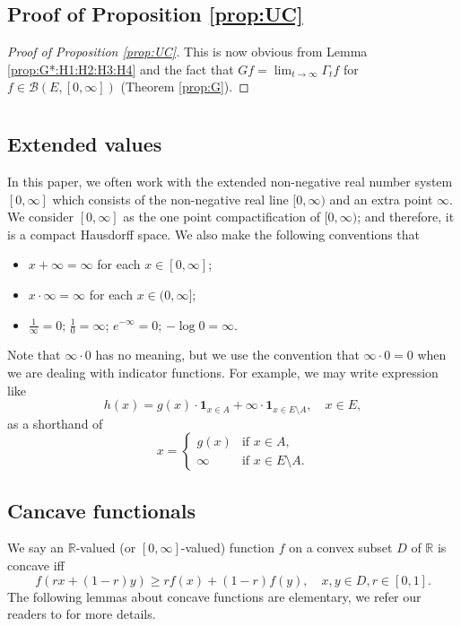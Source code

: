 \documentclass[12pt,a4paper]{amsart}
\numberwithin{equation}{section}
\theoremstyle{plain}
\theoremstyle{definition}
\theoremstyle{remark}
\begin{document}
\subsection{Proof of Proposition \ref{prop:UC}} \label{sec:UC}
\begin{proof}[Proof of Proposition \ref{prop:UC}]
	This is now obvious from Lemma \ref{prop:G*:H1:H2:H3:H4} and the fact that $Gf = \lim_{t\to \infty} \Gamma_t f$ for $f\in \mathcal B(E,[0,\infty])$ (Theorem \ref{prop:G}).
\end{proof}

\appendix\section{}
\subsection{Extended values} \label{sec:EV}
	In this paper, we often work with the extended non-negative real number system $[0,\infty]$ which consists of the non-negative real line $[0,\infty)$ and an extra point $\infty$.
	We consider $[0,\infty]$ as the one point compactification of $[0,\infty)$; and therefore, it is a compact Hausdorff space.
	We also make the following conventions that
\begin{itemize}
\item
	$x + \infty = \infty$ for each $x\in [0,\infty]$;
\item
	$x \cdot \infty = \infty$ for each $x\in (0,\infty]$;
\item
	$\frac{1}{\infty} = 0$; $\frac{1}{0} = \infty$; $e^{-\infty} =0$; $-\log 0 = \infty$.
\end{itemize}
	Note that $ \infty \cdot 0$ has no meaning, but we use the convention that $\infty \cdot 0 = 0$ when we are dealing with indicator functions.
	For example, we may write expression like
\begin{equation}
	h(x)
	= g(x) \cdot  \mathbf 1_{x\in A} + \infty \cdot \mathbf 1_{x \in E\setminus A}, \quad x\in E,
\end{equation}
	as a shorthand of
\begin{equation}
	x =
\begin{cases}
	g(x) & \text{if $x\in A$},
	\\ \infty & \text{if $x\in E\setminus A$}.
\end{cases}
\end{equation}

\subsection{Cancave functionals}
	We say an $\mathbb R$-valued (or $[0,\infty]$-valued) function $f$ on a convex subset $D$ of $\mathbb R$ is concave iff
\[
   	f(rx+(1-r) y)
 	\geq r f(x) + (1-r) f(y),
 	\quad x,y \in D, r \in [0,1].
\]
	The following lemmas about concave functions are elementary, we refer our readers to \cite[Chapter 6]{Dudley2002Real} for more details.
\end{document}
